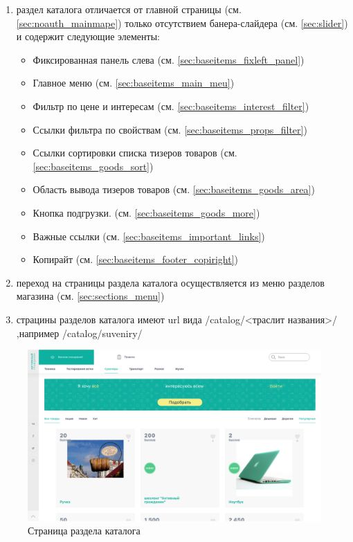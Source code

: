         \begin{enumerate}
            \item 
                раздел каталога отличается от главной страницы (см. \ref{sec:noauth_mainmape}) 
                только отсутствием банера-слайдера (см. \ref{sec:slider}) и содержит следующие элементы:
                \begin{itemize}
                    \item Фиксированная панель слева (см. \ref{sec:baseitems_fixleft_panel})
                    \item Главное меню (см. \ref{sec:baseitems_main_meu})
                    \item Фильтр по цене и интересам (см. \ref{sec:baseitems_interest_filter})
                    \item Ссылки фильтра по свойствам (см. \ref{sec:baseitems_props_filter})
                    \item Ссылки сортировки списка тизеров товаров (см. \ref{sec:baseitems_goods_sort})
                    \item Область вывода тизеров товаров (см. \ref{sec:baseitems_goods_area})
                    \item Кнопка подгрузки.  (см. \ref{sec:baseitems_goods_more})
                    \item Важные ссылки (см. \ref{sec:baseitems_important_links})
                    \item Копирайт (см. \ref{sec:baseitems_footer_copiright})
                \end{itemize}
            \item переход на страницы раздела каталога осуществляется из меню разделов магазина (см. \ref{sec:sections_menu})
            \item страцины разделов каталога имеют url вида /catalog/<траслит названия>/ ,например /catalog/suveniry/
        \end{enumerate}

        
        \begin{figure}
            \includegraphics[width=170mm]{02_noauth_funcs/figures/06.eps}
            \caption{Страница раздела каталога}
            \label{fig:catalog_section}
        \end{figure} 
        



